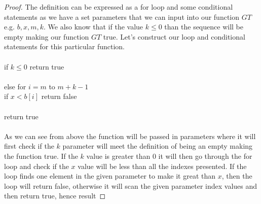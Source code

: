 \documentclass[12pt]{article}
\begin{document}
\begin{proof}
The definition can be expressed as a for loop and some conditional statements as we have a set parameters that we can input into our function $GT$ e.g. $b,x,m,k$.  We also know that if the value $k \leq 0$ than the sequence will be empty making our function $GT$ true. Let's construct our loop and conditional statements for this particular function. \\ \\
if $k \leq 0$ return true \\ \\
else for $i = m$ to $m + k - 1$ \\ 
if $x < b[i]$ return false \\ \\ 
return true \\ \\
As we can see from above the function will be passed in parameters where it will first check if the $k$ parameter will meet the definition of being an empty making the function true. If the $k$ value is greater than $0$ it will then go through the for loop and check if the $x$ value will be less than all the indexes presented. If the loop finds one element in the given parameter to make it great than $x$, then the loop will return false, otherwise it will scan the given parameter index values and then return true, hence result

\end{proof}
\end{document}
